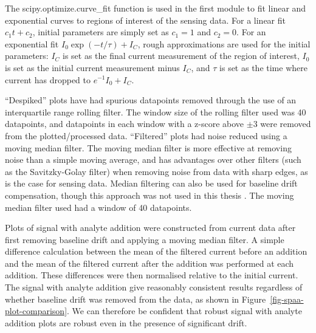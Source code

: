 \documentclass[
  a4paper,
]{scrbook}
\begin{document}
The scipy.optimize.curve\_fit function is used in the first module to
fit linear and exponential curves to regions of interest of the sensing
data. For a linear fit \(c_1t + c_2\), initial parameters are simply set
as \(c_1=1\) and \(c_2=0\). For an exponential fit
\(I_0\exp{(-t/\tau)} + I_C\), rough approximations are used for the
initial parameters: \(I_C\) is set as the final current measurement of
the region of interest, \(I_0\) is set as the initial current
measurement minus \(I_C\), and \(\tau\) is set as the time where current
has dropped to \(e^{-1}I_0 + I_C\).

``Despiked'' plots have had spurious datapoints removed through the use
of an interquartile range rolling filter. The window size of the rolling
filter used was 40 datapoints, and datapoints in each window with a
z-score above \(\pm 3\) were removed from the plotted/processed data.
``Filtered'' plots had noise reduced using a moving median filter. The
moving median filter is more effective at removing noise than a simple
moving average, and has advantages over other filters (such as the
Savitzky-Golay filter) when removing noise from data with sharp edges,
as is the case for sensing data. Median filtering can also be used for
baseline drift compensation, though this approach was not used in this
thesis \autocite{Stone2011}. The moving median filter used had a window
of 40 datapoints.

Plots of signal with analyte addition were constructed from current data
after first removing baseline drift and applying a moving median filter.
A simple difference calculation between the mean of the filtered current
before an addition and the mean of the filtered current after the
addition was performed at each addition. These differences were then
normalised relative to the initial current. The signal with analyte
addition give reasonably consistent results regardless of whether
baseline drift was removed from the data, as shown in
Figure~\ref{fig-spaa-plot-comparison}. We can therefore be confident
that robust signal with analyte addition plots are robust even in the
presence of significant drift.
\end{document}
